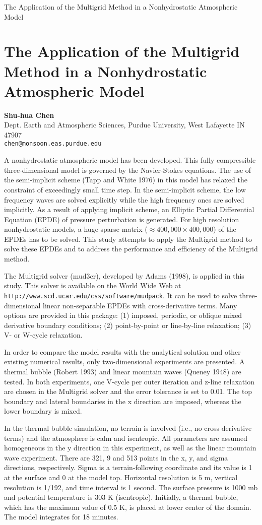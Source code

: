 \documentclass[11pt]{article}
\newcommand{\nextab}[4]{
	\section{#2}
	{\bf #1} \\ \nopagebreak
	{#3} \\ \nopagebreak
	{\tt #4} \nopagebreak
	}
\begin{document}
The Application of the Multigrid Method in a Nonhydrostatic
Atmospheric Model

\nextab{Shu-hua Chen}
	{The Application of the Multigrid Method in a Nonhydrostatic
	Atmospheric Model}
	{Dept. Earth and Atmospheric Sciences,
		Purdue University,
		West Lafayette IN 47907}
	{chen@monsoon.eas.purdue.edu}

A nonhydrostatic atmospheric model has been developed. This fully
compressible three-dimensional model is governed by the Navier-Stokes
equations. The use of the semi-implicit scheme (Tapp and White 1976)
in this model has relaxed the constraint of exceedingly small time
step. In the semi-implicit scheme, the low frequency waves are solved
explicitly while the high frequency ones are solved implicitly. As a
result of applying implicit scheme, an Elliptic Partial Differential
Equation (EPDE) of pressure perturbation is generated.  For high
resolution nonhydrostatic models, a huge sparse matrix
($\approx 400,000\times400,000$) of the EPDEs has to be solved.
This study attempts
to apply the Multigrid method to solve these EPDEs and to address the
performance and efficiency of the Multigrid method.

The Multigrid solver (mud3cr), developed by Adams (1998), is applied
in this study.  This solver is available on the World Wide Web at
{\tt http://www.scd.ucar.edu/css/software/mudpack}.
It can be used
to solve three-dimensional linear non-separable EPDEs with
cross-derivative terms.  Many options are provided in this package:
(1) imposed, periodic, or oblique mixed derivative boundary conditions;
(2) point-by-point or line-by-line relaxation;
(3) V- or W-cycle relaxation.

In order to compare the model results with the analytical solution
and other existing numerical results, only two-dimensional experiments
are presented.  A thermal bubble (Robert 1993) and linear mountain
waves (Queney 1948) are tested. In both experiments, one V-cycle per
outer iteration and z-line relaxation are chosen in the Multigrid
solver and the error tolerance is set to 0.01. The top boundary and
lateral boundaries in the x direction are imposed, whereas the lower
boundary is mixed.

In the thermal bubble simulation, no terrain is involved (i.e., no
cross-derivative terms) and the atmosphere is calm and isentropic.
All parameters are assumed homogeneous in the y direction in this
experiment, as well as the linear mountain wave experiment. There are
321, 9 and 513 points in the x, y, and sigma directions, respectively.
Sigma is a terrain-following coordinate and its value is 1 at the
surface and 0 at the model top. Horizontal resolution is 5 m, vertical
resolution is 1/192, and time interval is 1 second. The surface pressure
is 1000 mb and potential temperature is 303 K (isentropic). Initially,
a thermal bubble, which has the maximum value of 0.5 K, is placed at
lower center of the domain. The model integrates for 18 minutes.
\end{document}
